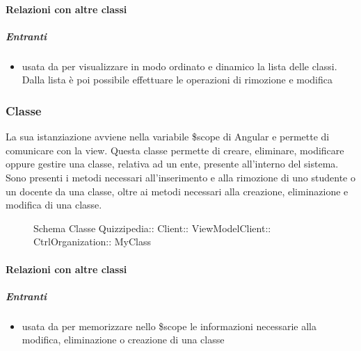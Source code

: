 \paragraph{Relazioni con altre classi}
\subparagraph{Entranti}
\begin{itemize}
\item usata da  per visualizzare in modo ordinato e dinamico la lista delle classi. Dalla lista è poi possibile effettuare le operazioni di rimozione e modifica
\end{itemize}
\subsubsection{Classe }
La sua istanziazione avviene nella variabile \$scope di Angular e permette di comunicare con la view. Questa classe permette di creare, eliminare, modificare oppure gestire una classe, relativa ad un ente, presente all'interno del sistema.
Sono presenti i metodi necessari all'inserimento e alla rimozione di uno studente o un docente da una classe, oltre ai metodi necessari alla creazione, eliminazione e modifica di una classe.
\begin{figure}[H]
\centering
\noindent{}
\caption[Schema Classe MyClass]{Schema Classe Quizzipedia:: Client:: ViewModelClient:: CtrlOrganization:: MyClass}
\end{figure}
\paragraph{Relazioni con altre classi}
\subparagraph{Entranti}
\begin{itemize}
\item usata da  per memorizzare nello \$scope le informazioni necessarie alla modifica, eliminazione o creazione di una classe
\end{itemize}
